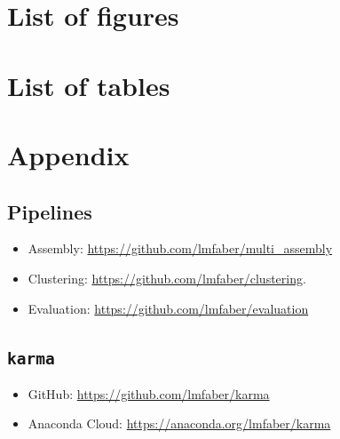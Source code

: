 \documentclass[12pt,a4paper,english]{article}
\makeatletter
\renewcommand\listoftables{%
        \@starttoc{lot}%
}
\renewcommand\listoffigures{%
        \@starttoc{lof}%
}
\makeatother
\begin{document}





\newpage
\section{List of figures}

\listoffigures

\newpage

\section{List of tables}
\listoftables

\newpage
\section{Appendix}
\label{appendix}
\subsection{Pipelines}
\label{appendix:pipelines}
\begin{itemize}
	\item Assembly: \href{https://github.com/lmfaber/multi\_assembly}{https://github.com/lmfaber/multi\_assembly}
	\item Clustering: \href{https://github.com/lmfaber/clustering}{https://github.com/lmfaber/clustering}.
	\item Evaluation: \href{https://github.com/lmfaber/evaluation}{https://github.com/lmfaber/evaluation}
\end{itemize}
\subsection{\texttt{karma}}
\label{appendix:karma}
	\begin{itemize}
	\item GitHub: \href{https://github.com/lmfaber/karma}{https://github.com/lmfaber/karma}
	\item Anaconda Cloud: 	\href{https://anaconda.org/lmfaber/karma}{https://anaconda.org/lmfaber/karma}
\end{itemize}
\end{document}
